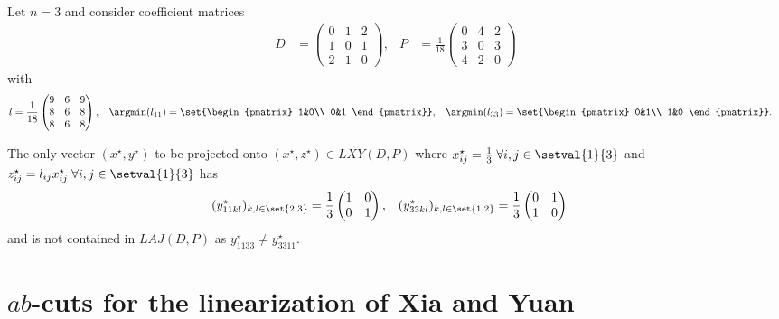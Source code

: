 \begin{example}
\label{example:strictly_contained}
	Let $n = 3$ and consider coefficient matrices
	\begin{align*}
		D &=
		\begin{pmatrix}
			0&1&2\\
			1&0&1\\
			2&1&0
		\end{pmatrix},&
		P &= \frac{1}{18}
		\begin{pmatrix}
			0&4&2\\
			3&0&3\\
			4&2&0
		\end{pmatrix}
	\end{align*}
	with 
	\begin{align*}
		l &= \frac{1}{18}
		\begin{pmatrix}
			9&6&9\\
			8&6&8\\
			8&6&8
		\end{pmatrix},&
		\argmin(l_{11})&=
		\set{\begin{pmatrix}
			1&0\\
			0&1
		\end{pmatrix}},&
		\argmin(l_{33})&=
		\set{\begin{pmatrix}
			0&1\\
			1&0
		\end{pmatrix}}.		
	\end{align*}
	
	The only vector $(x^\star, y^\star)$ to be projected onto $(x^\star, z^\star)\in LXY(D,P)$ where $x^\star_{ij} = \frac{1}{3}\;\forall i,j\in\setval{1}{3}$ and $z^\star_{ij} = l_{ij}x^\star_{ij}\;\forall i,j\in\setval{1}{3}$ has
	\begin{align*}
		(y^\star_{11kl})_{k,l\in\set{2,3}} &= \frac{1}{3}
		\begin{pmatrix}
			1&0\\
			0&1			
		\end{pmatrix},&
		(y^\star_{33kl})_{k,l\in\set{1,2}} &= \frac{1}{3}
		\begin{pmatrix}
			0&1\\
			1&0
		\end{pmatrix}
	\end{align*}
	and is not contained in $LAJ(D,P)$ as $y^\star_{1133}\neq y^\star_{3311}$.
\end{example}

\section{$ab$-cuts for the linearization of Xia and Yuan}
\label{sec:newInequalities}

